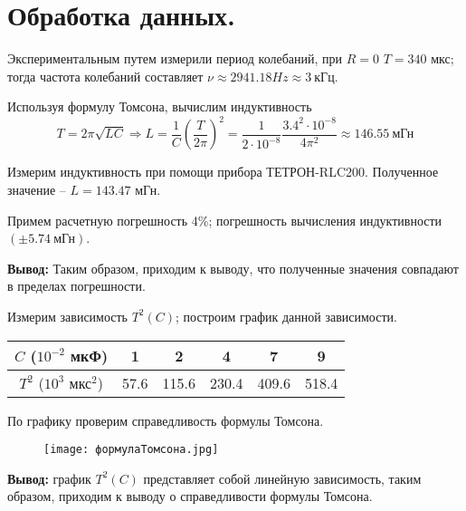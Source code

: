 	\section{Обработка данных.}
	
	\noindent Экспериментальным путем измерили период колебаний, при $R = 0$ $T = 340$ мкс; тогда частота колебаний составляет $\nu \approx 2941.18 Hz \approx 3 ~ \text{кГц} $.
	
	\hfill
	
	\noindent Используя формулу Томсона, вычислим индуктивность
	\begin{equation*}
		T = 2 \pi \sqrt{LC} \Rightarrow L = \frac{1}{C} \left(\frac{T}{2 \pi} \right)^2 = \frac{1}{2 \cdot 10^{-8}} \frac{3.4^2 \cdot 10^{-8}}{4 \pi^2} \approx 146.55 ~ \text{мГн}
	\end{equation*}
	
	\noindent Измерим индуктивность при помощи прибора ТЕТРОН-RLC200. Полученное значение -- $L = 143.47$ мГн.
	
	\noindent Примем расчетную погрешность 4\%; погрешность вычисления индуктивности $(\pm 5.74 ~ \text{мГн})$.
	
	\hfill
	
	\noindent \textbf{Вывод:} Таким образом, приходим к выводу, что полученные значения совпадают в пределах погрешности.
	
	\hfill
	
	\noindent Измерим зависимость $T^2(C)$; построим график данной зависимости.
	
	\begin{table}[h!]
		\begin{center}
			\begin{tabular}{|c|c|c|c|c|c|} \hline
				$C$ ($10^{-2}$ мкФ)   & 1     & 2      & 4      & 7      & 9 \\ \hline
				$T^2$ ($10^3$ мкс$^2$) & 57.6  & 115.6  & 230.4  & 409.6  & 518.4  \\ \hline
			\end{tabular}
		\end{center}
	\end{table}

	\noindent По графику проверим справедливость формулы Томсона.
	
	\begin{figure} [h!]
		\centering
		\texttt{[image: формулаТомсона.jpg]}
	\end{figure}

	\noindent \textbf{Вывод:} график $T^2(C)$ представляет собой линейную зависимость, таким образом, приходим к выводу о справедливости формулы Томсона.
	
